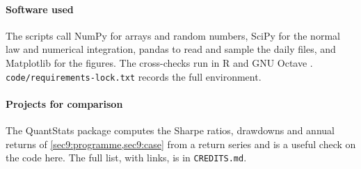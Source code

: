 \begin{chapterrefs}
\paragraph{Software used}
The scripts call NumPy \parencite{numpy} for arrays and random numbers, SciPy \parencite{scipy}
for the normal law and numerical integration, pandas \parencite{pandas} to read and sample the daily
files, and Matplotlib \parencite{matplotlib} for the figures. The cross-checks run in R
\parencite{rcore} and GNU Octave \parencite{octave}. \texttt{code/requirements-lock.txt} records the full
environment.

\paragraph{Projects for comparison}
The QuantStats package \parencite{quantstats} computes the Sharpe ratios, drawdowns and annual returns
of \cref{sec9:programme,sec9:case} from a return series and is a useful check on the code here. The full
list, with links, is in \texttt{CREDITS.md}.


\end{chapterrefs}
